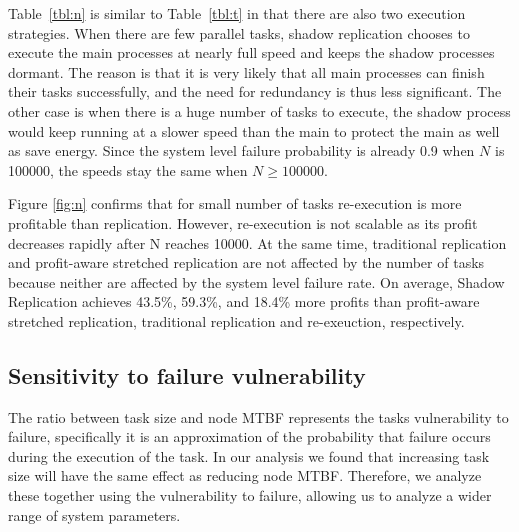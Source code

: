 Table~\ref{tbl:n} is similar to Table~\ref{tbl:t} in that there are also two execution strategies. When there are few parallel tasks, shadow
replication chooses to execute the main processes at nearly full speed and keeps
the shadow processes dormant. The
reason is that it is very likely that all main processes can finish
their tasks successfully, and the need for redundancy is thus less
significant. The other case is when there is a huge number of
tasks to execute, the shadow process would keep running at a slower speed than the main to protect the main as well as save energy. Since the system level failure probability is already 0.9 when $N$ is 100000, the speeds stay the same when $N \ge 100000$.

Figure \ref{fig:n} confirms that for small number of tasks
re-execution is more profitable than replication. However, re-execution is not scalable
as its profit decreases rapidly after N reaches 10000. At the same time, traditional
replication and profit-aware stretched replication are not
affected by the number of tasks because neither are affected by the
system level failure rate. On average, Shadow Replication achieves 43.5\%, 59.3\%, and 18.4\%
more profits than profit-aware stretched replication, traditional replication and re-exeuction, respectively. 

\subsection{Sensitivity to failure vulnerability}

The ratio between task size and node MTBF represents the tasks
vulnerability to failure, specifically it is an approximation of the
probability that failure occurs during the execution of the task. In our
analysis we found that increasing task size will have the same effect
as reducing node MTBF. Therefore, we analyze these together using the
vulnerability to failure, allowing us to analyze a wider range of
system parameters. %

%	


